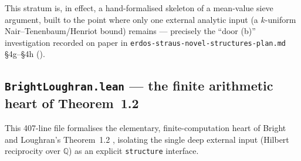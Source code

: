 \documentclass[11pt]{article}
\theoremstyle{plain}
\theoremstyle{definition}
\theoremstyle{remark}
\newcommand{\file}[1]{\texttt{#1}}
\newcommand{\lean}[1]{\texttt{#1}}
\renewcommand{\_}{\textunderscore\allowbreak}
\newcommand{\Q}{\mathbb{Q}}
\begin{document}
This stratum is, in effect, a hand-formalised skeleton of a mean-value sieve argument, built to
the point where only one external analytic input (a $k$-uniform Nair--Tenenbaum/Henriot bound)
remains — precisely the ``door (b)'' investigation recorded on paper in
\texttt{erdos-\allowbreak straus-\allowbreak novel-\allowbreak structures-\allowbreak plan.md} \S4g--\S4h ().


\subsection{\file{BrightLoughran.lean} — the finite arithmetic heart of Theorem~1.2}
\label{subsec:brightloughran-lean}

This 407-line file formalises the elementary, finite-computation heart of Bright and
Loughran's Theorem~1.2 \cite{BrightLoughran2020}, isolating the single deep external input
(Hilbert reciprocity over $\Q$) as an explicit \lean{structure} interface.
\end{document}
